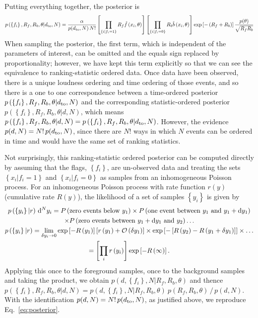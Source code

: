 \documentclass[aps,prd]{revtex4-1}
\newcommand{\order}[1]{\mathcal{O}\left( #1 \right)}
\newcommand{\mathset}[1]{\left\{ #1 \right\}}
\begin{document}
Putting everything together, the posterior is
\begin{equation}
  \label{eq:posterior}
  p\left( \mathset{f_i}, R_f, R_b, \theta | d_{\rm to},N \right) =
  \frac{\alpha}{p(d_{\rm to},N)\,N!} \left[ \prod_{\mathset{i | f_i =
        1}} R_f \hat{f}\left(x_i, \theta\right) \right] \left[
    \prod_{\mathset{i | f_i = 0}} R_b \hat{b}\left( x_i, \theta\right)
    \right] \exp\left[ - \left(R_f + R_b\right) \right]
  \frac{p(\theta)}{\sqrt{R_f R_b}}
\end{equation}
When sampling the posterior, the first term, which is independent of
the parameters of interest, can be omitted and the equals sign
replaced by proportionality; however, we have kept this term
explicitly so that we can see the equivalence to ranking-statistic
ordered data. Once data have been observed, there is a unique loudness
ordering and time ordering of those events, and so there is a one to
one correspondence between a time-ordered posterior $p\left(
\mathset{f_i}, R_f, R_b, \theta | d_{\rm to},N \right)$ and the
corresponding statistic-ordered posterior $ p\left( \mathset{f_i},
R_f, R_b, \theta | d,N \right)$, which means $p\left( \mathset{f_i},
R_f, R_b, \theta | d,N \right) = p\left( \mathset{f_i}, R_f, R_b,
\theta | d_{\rm to},N \right)$. However, the evidence $p(d,N) =
N!\,p(d_{\rm to},N)$, since there are $N!$ ways in which $N$ events
can be ordered in time and would have the same set of ranking
statistics.

Not surprisingly, this ranking-statistic ordered posterior can be
computed directly by assuming that the flags, $\mathset{f_i}$, are
un-observed data and treating the sets $\mathset{x_i | f_i = 1}$ and
$\mathset{x_i | f_i = 0}$ as samples from an inhomogeneous Poisson
process.  For an inhomogeneous Poisson process with rate function
$r(y)$ (cumulative rate $R(y)$), the likelihood of a set of samples
$\mathset{y_i}$ is given by
\begin{multline}
  p\left( \mathset{y_i} | r \right) \,{\rm d}^Ny_i= P\left(
  \textnormal{zero events below } y_1 \right) \times P\left(
  \textnormal{one event between } y_1 \textnormal{ and } y_1 + {\rm
    d}y_1 \right) \\ \times P\left( \textnormal{zero events between }
  y_1+{\rm d}y_1 \textnormal{ and } y_2 \right) \ldots \\ p\left(
  \mathset{y_i} | r \right) = \lim_{\delta y_i \to 0} \exp\left[ -
    R\left(y_1\right) \right] \left[ r\left( y_1 \right) +
    \order{\delta y_1} \right] \times \exp\left[ - \left[ R\left( y_2
      \right) - R\left( y_1 + \delta y_1\right) \right] \right] \times
  \ldots \\ = \left[\prod_i r\left( y_i \right)\right] \exp\left[ -
    R\left( \infty \right) \right].
\end{multline}
Applying this once to the foreground samples, once to the background
samples and taking the product, we obtain $p(d,\mathset{f_i}, N | R_f,
R_b, \theta)$ and thence $p(\mathset{f_i}, R_f, R_b, \theta | d,N) =
p(d,\mathset{f_i}, N | R_f, R_b, \theta)\ p(R_f, R_b, \theta)\, /\,
p(d,N)$. With the identification $p(d,N) = N!\,p(d_{\rm to},N)$, as
justified above, we reproduce Eq.~\eqref{eq:posterior}.
\end{document}
